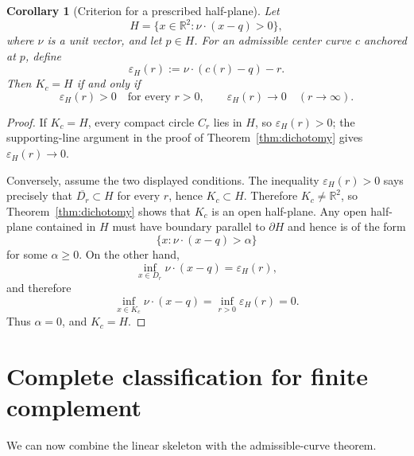 \documentclass[11pt]{article}
\newtheorem{corollary}[theorem]{Corollary}
\newcommand{\R}{\mathbb{R}}
\newcommand{\ol}{\overline}
\begin{document}
\begin{corollary}[Criterion for a prescribed half-plane]\label{cor:prescribedhalfplane}
Let
\[
H=\{x\in\R^2:\nu\cdot(x-q)>0\},
\]
where $\nu$ is a unit vector, and let $p\in H$. For an admissible center curve $c$ anchored at $p$, define
\[
\varepsilon_H(r):=\nu\cdot(c(r)-q)-r.
\]
Then $K_c=H$ if and only if
\[
\varepsilon_H(r)>0\quad\text{for every }r>0,
\qquad
\varepsilon_H(r)\longrightarrow0\quad(r\to\infty).
\]
\end{corollary}

\begin{proof}
If $K_c=H$, every compact circle $C_r$ lies in $H$, so $\varepsilon_H(r)>0$; the supporting-line argument in the proof of Theorem~\ref{thm:dichotomy} gives $\varepsilon_H(r)\to0$.

Conversely, assume the two displayed conditions. The inequality $\varepsilon_H(r)>0$ says precisely that $\ol{D_r}\subset H$ for every $r$, hence $K_c\subset H$. Therefore $K_c\ne\R^2$, so Theorem~\ref{thm:dichotomy} shows that $K_c$ is an open half-plane. Any open half-plane contained in $H$ must have boundary parallel to $\partial H$ and hence is of the form
\[
\{x:\nu\cdot(x-q)>\alpha\}
\]
for some $\alpha\ge0$. On the other hand,
\[
\inf_{x\in D_r}\nu\cdot(x-q)=\varepsilon_H(r),
\]
and therefore
\[
\inf_{x\in K_c}\nu\cdot(x-q)
=\inf_{r>0}\varepsilon_H(r)=0.
\]
Thus $\alpha=0$, and $K_c=H$.
\end{proof}

\section{Complete classification for finite complement}

We can now combine the linear skeleton with the admissible-curve theorem.
\end{document}
